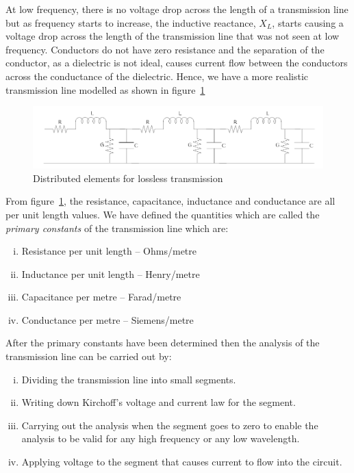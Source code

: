At low frequency, there is no voltage drop across the length of a transmission line but as frequency starts to increase, the inductive reactance, $X_{L}$, starts causing a voltage drop across the length of the transmission line that was not seen at low frequency. Conductors do not have zero resistance and the separation of the conductor, as a dielectric is not ideal, causes current flow between the conductors across the conductance of the dielectric. Hence, we have a more realistic transmission line modelled as shown in figure~\ref{fig:sixth}
\begin{figure}[h]
\centering
\includegraphics[width=1\linewidth]{./graphics/sixth}
\caption{Distributed elements for lossless transmission}
\label{fig:sixth}
\end{figure}

From figure~\ref{fig:sixth}, the resistance, capacitance, inductance and conductance are all per unit length values. We have defined the quantities which are called the \textit{primary constants} of the transmission line which are:
\begin{enumerate}[(i)]
\item Resistance per unit length – Ohms/metre
\item Inductance per unit length – Henry/metre
\item Capacitance per metre – Farad/metre
\item Conductance per metre – Siemens/metre
\end{enumerate}
After the primary constants have been determined then the analysis of the transmission line can be carried out by:
\begin{enumerate}[(i)]
\item Dividing the transmission line into small segments.
\item Writing down Kirchoff's voltage and current law for the segment.
\item Carrying out the analysis when the segment goes to zero to enable the analysis to be valid for any high frequency or any low wavelength. 
\item Applying voltage to the segment that causes current to flow into the circuit.
\end{enumerate}


